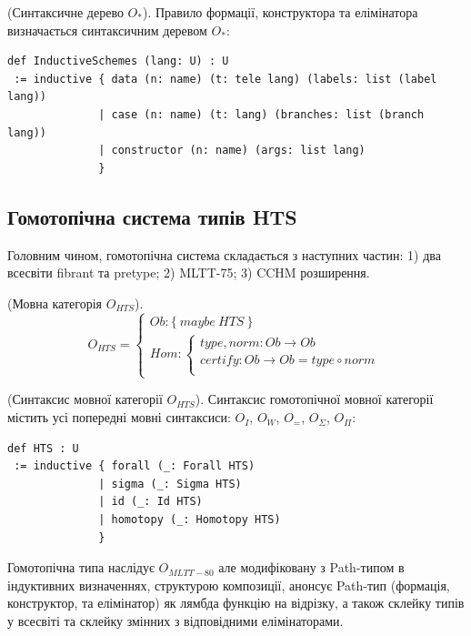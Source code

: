 \begin{definition} (Синтаксичне дерево $O_{*}$).
Правило формації, конструктора та елімінатора визначається синтаксичним деревом $O_{*}$:
\begin{lstlisting}
def InductiveSchemes (lang: U) : U
 := inductive { data (n: name) (t: tele lang) (labels: list (label lang))
              | case (n: name) (t: lang) (branches: list (branch lang))
              | constructor (n: name) (args: list lang)
              }
\end{lstlisting}
\end{definition}

\newpage
\subsection{Гомотопічна система типів HTS}

Головним чином, гомотопічна система складається з наступних частин:
1) два всесвіти fibrant та pretype;
2) MLTT-75;
3) CCHM розширення.

\begin{definition} (Мовна категорія $O_{HTS}$).
$$
O_{HTS} =
\begin{cases}
Ob: \{\ maybe\ HTS\ \} \\
Hom: \begin{cases}
type,norm: Ob \rightarrow Ob \\
certify: Ob \rightarrow Ob = type \circ norm \\
\end{cases}
\end{cases}
$$
\end{definition}

\begin{definition} (Синтаксис мовної категорії $O_{HTS}$).
Синтаксис гомотопічної мовної категорії містить усі
попередні мовні синтаксиси: $O_I$, $O_W$, $O_=$, $O_\Sigma$, $O_\Pi$:
\begin{lstlisting}
def HTS : U
 := inductive { forall (_: Forall HTS)
              | sigma (_: Sigma HTS)
              | id (_: Id HTS)
              | homotopy (_: Homotopy HTS)
              }
\end{lstlisting}
\end{definition}

Гомотопічна типа наслідує $O_{MLTT-80}$ але модифіковану з
Path-типом в індуктивних визначеннях, структурою композиції,
анонсує Path-тип (формація, конструктор, та елімінатор)
як лямбда функцію на відрізку, а також склейку типів у всесвіті
та склейку змінних з відповідними елімінаторами.

